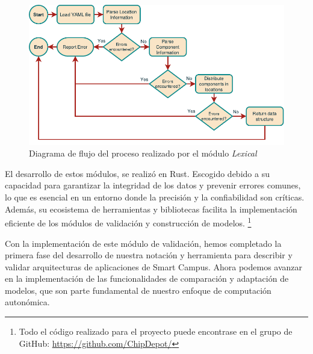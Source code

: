 \begin{figure}[H]
    \centering
    \caption{Diagrama de flujo del proceso realizado por el módulo \textit{Lexical}}
    \label{fig:LexicalFlow}
    \vspace{2mm}
    \includegraphics[width=\linewidth]{images/LexicalFlow.pdf}
\end{figure}

El desarrollo de estos módulos, se realizó en Rust. Escogido debido a su capacidad para garantizar la integridad de los datos y prevenir errores comunes, lo que es esencial en un entorno donde la precisión y la confiabilidad son críticas. Además, su ecosistema de herramientas y bibliotecas facilita la implementación eficiente de los módulos de validación y construcción de modelos. \footnote{Todo el código realizado para el proyecto puede encontrase en el grupo de GitHub: \url{https://github.com/ChipDepot/}}

Con la implementación de este módulo de validación, hemos completado la primera fase del desarrollo de nuestra notación y herramienta para describir y validar arquitecturas de aplicaciones de Smart Campus. Ahora podemos avanzar en la implementación de las funcionalidades de comparación y adaptación de modelos, que son parte fundamental de nuestro enfoque de computación autonómica.


